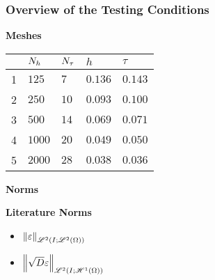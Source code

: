 \begin{frame}
    \frametitle{Overview of the Testing Conditions}

    \vspace*{\fill}
    \begin{center}
        {\color{\accentcolor} \Large \textbf{Meshes}}
        \vspace*{0.25cm}

        \begin{minipage}{0.75\textwidth}
            \begin{table}[!ht]
                \def\arraystretch{1.25}
                \begin{tabular}{ | C{0.75cm} || C{1.75cm} | C{1.75cm} | C{1.75cm} | C{1.75cm} | }
                    \hline
                     & $N_h$ & $N_{\tau}$ & $h$ & $\tau$ \\
                    \hline
                     & $125$ & $7$ & $\num{0.136}$ & $\num{0.143}$ \\
                    2 & $250$ & $10$ & $\num{0.093}$ & $\num{0.100}$ \\
                    3 & $500$ & $14$ & $\num{0.069}$ & $\num{0.071}$ \\
                    4 & $1000$ & $20$ & $\num{0.049}$ & $\num{0.050}$ \\
                    5 & $2000$ & $28$ & $\num{0.038}$ & $\num{0.036}$ \\
                    \hline
                \end{tabular}
            \end{table}
        \end{minipage}
    \end{center}

    \vspace*{\fill}

    \begin{center}
        {\color{\accentcolor} \Large \textbf{Norms}}
    \end{center}

    \begin{multicols}{2}

        \begin{center}
            {\color{\accentcolor} \Large \textbf{Literature Norms}}
            \vspace*{0.5cm}

            \begin{minipage}{0.25\textwidth}
                \begin{itemize}
                    \item $\left\lVert \varepsilon \right\rVert_{\mathscr{L}^{2}(I; \mathscr{L}^{2}(\Omega))}$
                    \item {\color{\accentcolor} $\left\lVert \sqrt{D} \varepsilon \right\rVert_{\mathscr{L}^{2}(I; \mathscr{H}^{1}(\Omega))}$}
                \end{itemize}
            \end{minipage}
        \end{center}


\end{multicols}
\end{frame}
